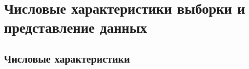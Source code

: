 \documentclass[11pt,a4paper]{article}
\begin{document}
%
%
%

    \hypertarget{ux447ux438ux441ux43bux43eux432ux44bux435-ux445ux430ux440ux430ux43aux442ux435ux440ux438ux441ux442ux438ux43aux438-ux432ux44bux431ux43eux440ux43aux438-ux438-ux43fux440ux435ux434ux441ux442ux430ux432ux43bux435ux43dux438ux435-ux434ux430ux43dux43dux44bux445}{%
\section{Числовые характеристики выборки и представление
данных}\label{ux447ux438ux441ux43bux43eux432ux44bux435-ux445ux430ux440ux430ux43aux442ux435ux440ux438ux441ux442ux438ux43aux438-ux432ux44bux431ux43eux440ux43aux438-ux438-ux43fux440ux435ux434ux441ux442ux430ux432ux43bux435ux43dux438ux435-ux434ux430ux43dux43dux44bux445}}

\hypertarget{ux447ux438ux441ux43bux43eux432ux44bux435-ux445ux430ux440ux430ux43aux442ux435ux440ux438ux441ux442ux438ux43aux438}{%
\subsection{Числовые
характеристики}\label{ux447ux438ux441ux43bux43eux432ux44bux435-ux445ux430ux440ux430ux43aux442ux435ux440ux438ux441ux442ux438ux43aux438}}
\end{document}

